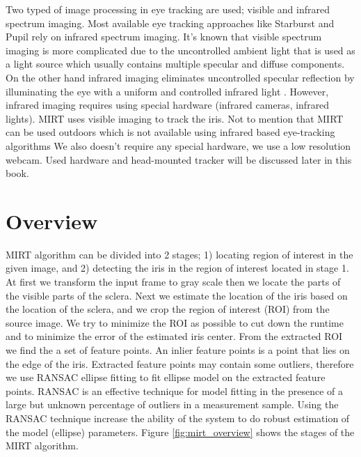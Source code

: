\documentclass[12pt,fleqn]{book} %
\begin{document}
Two typed of image processing in eye tracking are used; visible and infrared spectrum imaging. Most available eye tracking approaches like Starburst \cite{starburst} and Pupil \cite{pupil} rely on infrared spectrum imaging. It's known that visible spectrum imaging is more complicated due to the uncontrolled ambient light that is used as a light source which usually contains multiple specular and diffuse components. On the other hand infrared imaging eliminates uncontrolled specular reflection by illuminating the eye with a uniform and controlled infrared light \cite{starburst}. However, infrared imaging requires using special hardware (infrared cameras, infrared lights). MIRT uses visible imaging to track the iris. Not to mention that MIRT can be used outdoors which is not available using infrared based eye-tracking algorithms We also doesn't require any special hardware, we use a low resolution webcam. Used hardware and head-mounted tracker will be discussed later in this book.\bigskip


\section{Overview}
MIRT algorithm can be divided into 2 stages; 1) locating region of interest in the given image, and 2) detecting the iris in the region of interest located in stage 1. At first we transform the input frame to gray scale then we locate the parts of the visible parts of the sclera. Next we estimate the location of the iris based on the location of the sclera, and we crop the region of interest (ROI) from the source image. We try to minimize the ROI as possible to cut down the runtime and to minimize the error of the estimated iris center. From the extracted ROI we find the a set of feature points. An inlier feature points is a point that lies on the edge of the iris. Extracted feature points may contain some outliers, therefore we use RANSAC ellipse fitting to fit ellipse model on the extracted feature points. RANSAC is an effective technique for model fitting in the presence of a large but unknown percentage of outliers in a measurement sample. Using the RANSAC technique increase the ability of the system to do robust estimation of the model (ellipse) parameters. Figure \ref{fig:mirt_overview} shows the stages of the MIRT algorithm.
\end{document}
